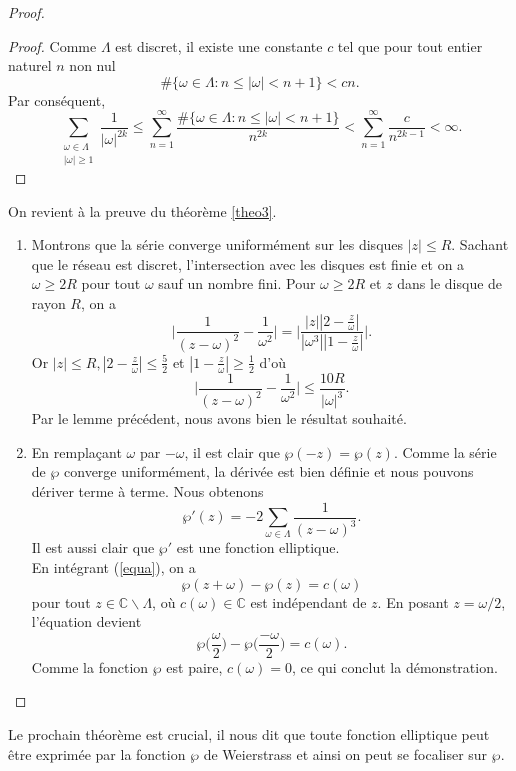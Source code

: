 \documentclass[a4paper]{article}
\begin{document}
\begin{proof}
\begin{proof}
Comme $\Lambda$ est discret, il existe une constante     $c$ tel que pour tout entier naturel $n$ non nul
\begin{equation*}
\#\{\omega \in \Lambda : n \leqslant |\omega| < n+1\} <cn.
\end{equation*}
Par conséquent,
\begin{equation*}
\sum \limits_{\substack{ \omega\in \Lambda \\ |\omega|\geqslant 1}} \frac{1}{|\omega|^{2k}} \leqslant \sum \limits_{n=1}^\infty \frac{\#\{\omega \in \Lambda : n \leqslant |\omega| < n+1\}}{n^{2k}} < \sum \limits_{n=1}^\infty \frac{c}{n^{2k-1}}<\infty.
\end{equation*}
\end{proof}
\noindent On revient à la preuve du théorème \ref{theo3}.
\begin{enumerate}
\item
Montrons que la série converge uniformément sur les disques $|z| \leqslant R$. Sachant que le réseau est discret, l'intersection avec les disques est finie et on a $\omega \geqslant 2R$ pour tout $\omega$ sauf un nombre fini.
Pour $\omega \geqslant 2R$ et $z$ dans le disque de rayon $R$, on a 
\begin{equation*}
\Bigg|\frac{1}{(z-\omega)^2}-\frac{1}{\omega^2}\Bigg|=\Bigg| \frac{|z| |2-\frac{z}{\omega}|}{|\omega^3| |1-\frac{z}{\omega}|} \Bigg|.
\end{equation*}
Or $|z| \leqslant R, |2-\frac{z}{\omega}|\leqslant \frac{5}{2}$ et $|1-\frac{z}{\omega}| \geqslant \frac{1}{2}$ d'où 
\begin{equation*}
\Bigg|\frac{1}{(z-\omega)^2}-\frac{1}{\omega^2}\Bigg| \leqslant \frac{10R}{|\omega|^3}.
\end{equation*}
Par le lemme précédent, nous avons bien le résultat souhaité.
\item En remplaçant $\omega$ par $-\omega$, il est clair que $\wp(-z)=\wp(z)$.
Comme la série de $\wp$ converge uniformément, la dérivée est bien définie et nous pouvons dériver terme à terme. Nous obtenons
\begin{equation} \label{equa}
\wp'(z)=-2 \sum \limits_{\omega \in \Lambda} \frac{1}{(z-\omega)^3}.
\end{equation}
Il est aussi clair que $\wp'$ est une fonction elliptique. \\
En intégrant (\ref{equa}), on a
\begin{equation*}
\wp(z+\omega)-\wp(z)=c(\omega)
\end{equation*}
pour tout $z \in \mathbb{C} \backslash \Lambda$, où $c(\omega) \in \mathbb{C}$ est indépendant de $z$.
En posant $z=\omega/2$, l'équation devient 
\begin{equation*}
\wp\Big(\frac{\omega}{2}\Big)-\wp\Big(\frac{-\omega}{2}\Big)=c(\omega).
\end{equation*}
Comme la fonction $\wp$ est paire, $c(\omega)=0$, ce qui conclut la démonstration.
\end{enumerate}
\end{proof}
\noindent Le prochain théorème est crucial, il nous dit que toute fonction elliptique peut être exprimée par la fonction $\wp$ de Weierstrass et ainsi on peut se focaliser sur $\wp$.
\end{document}
